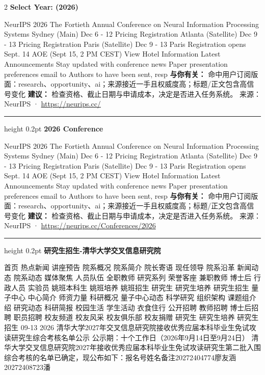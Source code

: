 \documentclass[10.5pt]{ctexart}
\begin{document}
\begin{multicols}{2}
{\large\bfseries Select Year: (2026)}\par
NeurIPS 2026 The Fortieth Annual Conference on Neural Information Processing Systems Sydney (Main) Dec 6 - 12 Pricing Registration Atlanta (Satellite) Dec 9 - 13 Pricing Registration Paris (Satellite) Dec 9 - 13 Paris Registration opens Sept. 14 AOE (Sept 15, 2 PM CEST) View Hotel Information Latest Announcements Stay updated with conference news Paper presentation preferences email to Authors to have been sent, resp
\textbf{与你有关：} 命中用户订阅版面：research、opportunity、ai；来源接近一手且权威度高；标题/正文包含高信号变化
\textbf{建议：} 检查资格、截止日期与申请成本，决定是否进入任务系统。
{\footnotesize\color{ormuted} 来源：NeurIPS · \url{https://neurips.cc/}}
\vspace{2mm}
\hrule height 0.2pt
\vspace{2mm}
{\large\bfseries 2026 Conference}\par
NeurIPS 2026 The Fortieth Annual Conference on Neural Information Processing Systems Sydney (Main) Dec 6 - 12 Pricing Registration Atlanta (Satellite) Dec 9 - 13 Pricing Registration Paris (Satellite) Dec 9 - 13 Paris Registration opens Sept. 14 AOE (Sept 15, 2 PM CEST) View Hotel Information Latest Announcements Stay updated with conference news Paper presentation preferences email to Authors to have been sent, resp
\textbf{与你有关：} 命中用户订阅版面：research、opportunity、ai；来源接近一手且权威度高；标题/正文包含高信号变化
\textbf{建议：} 检查资格、截止日期与申请成本，决定是否进入任务系统。
{\footnotesize\color{ormuted} 来源：NeurIPS · \url{https://neurips.cc/Conferences/2026}}
\vspace{2mm}
\hrule height 0.2pt
\vspace{2mm}
{\large\bfseries 研究生招生-清华大学交叉信息研究院}\par
首页 热点新闻 讲座预告 院系概况 院系简介 院长寄语 现任领导 院系沿革 新闻动态 院系动态 媒体聚焦 人员队伍 全职教师 研究系列 荣誉客座 兼职教师 博士后 行政人员 实验员 姚班本科生 姚班培养 姚班招生 研究生 研究生培养 研究生招生 量子中心 中心简介 师资力量 科研概况 量子中心动态 科学研究 组织架构 课题组介绍 研究动态 科研简报 校园生活 学生活动 衣食住行 公开招聘 教师招聘 博士后招聘 职员招聘 校友频道 校友风采 校友俱乐部 校友捐赠 研究生 研究生培养 研究生招生 09-13 2026 清华大学2027年交叉信息研究院接收优秀应届本科毕业生免试攻读研究生综合考核名单公示 公示期：十个工作日（2026年9月14日至9月24日） 清华大学交叉信息研究院2027年接收优秀应届本科毕业生免试攻读研究生第二批入围综合考核的名单已确定，现公布如下：报名号姓名备注20272404774廖友涵20272408723潘

\end{multicols}
\end{document}

